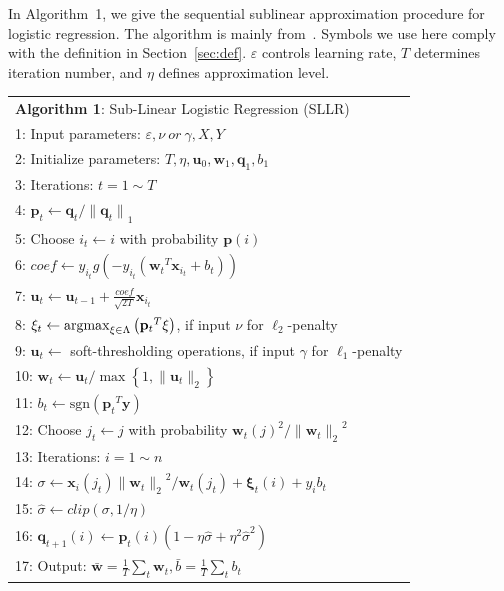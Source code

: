 \documentclass[10pt, conference, compsocconf]{IEEEtran}
\newcommand{\bw}{\mathbf{w}}
\newcommand{\bu}{\mathbf{u}}
\newcommand{\bp}{\mathbf{p}}
\newcommand{\bq}{\mathbf{q}}
\newcommand{\bxi}{\mathbf{\xi}}
\newcommand{\lc}{\left(}
\newcommand{\rc}{\right)}
\newcommand{\li}{\lc i\rc}
\newcommand{\lj}{\lc j\rc}
\newcommand{\tspace}{\hspace*{2em}}
\newcommand{\tspaces}{\hspace*{1.5em}}
\def\argmax{\mathop{\rm argmax}}
\def\sgn{\mathrm{sgn}}
\begin{document}
In Algorithm~1, we give the sequential sublinear approximation procedure for logistic regression. The algorithm is mainly from~\cite{peng2012sublinear}. Symbols we use here comply with the definition in Section~\ref{sec:def}. $\varepsilon$ controls learning rate, $T$ determines iteration number, and $\eta$ defines approximation level.
	\begin{table} [ht]
	\begin{tabular}{l}
	\hline\noalign{\smallskip}
	\textbf{Algorithm 1}: Sub-Linear Logistic Regression (SLLR) \\
	\noalign{\smallskip}
	\hline
	\noalign{\smallskip}
	1:	Input parameters: $\varepsilon, \nu~or~\gamma, X, Y$ \\
	2:	Initialize parameters: $T, \eta, {\mathbf{u}}_{0}, {\bw}_{1}, {\mathbf{\bq}}_{1}, {b}_{1}$\\
	3:	Iterations: $t=1 \sim T$ \\
	4:	\tspace ${\bp}_{t}\leftarrow{\bq}_{t}/{\|{\bq}_{t}\|}_{1}$ \\
	5:  \tspace Choose ${i}_{t}\leftarrow i$ with probability $\bp(i)$ \\
	6:	\tspace $coef\leftarrow{y}_{{i}_{t}}g\lc-{y}_{{i}_{t}}\lc {{\bw}_{t}}^{T}{\mathbf{x}}_{i_t}+{b}_{t} \rc\rc$ \\
	7:	\tspace ${\bu}_{t}\leftarrow {\bu}_{t-1}+\frac{coef}{\sqrt{2T}}{\mathbf{x}}_{{i}_{t}}$ \\
    8:  \tspace ${\bxi}_{t}\leftarrow \argmax_{\bxi\in \Lambda}\lc{{\bp}_{t}}^{T}\bxi\rc$, if input $\nu$ for $\ell_2$-penalty \\
    9:  \tspace $\bu_t\leftarrow$ soft-thresholding operations, if input $\gamma$ for $\ell_1$-penalty \\
	10:	\tspaces ${\bw}_{t}\leftarrow {\bu}_{t}/\max \left\{1,\|{\bu}_{t}\|_2 \right\}$ \\
    11: \tspaces ${b}_{t}\leftarrow \sgn\lc {{\bp}_{t}}^{T}\mathbf{y}\rc$ \\
	12:	\tspaces Choose ${j}_{t}\leftarrow j$ with probability ${{\bw}_{t}\lj}^{2}/{\|{\bw}_{t}\|_2}^{2} $ \\
	13:	\tspaces Iterations: $i=1 \sim n$ \\
	14:	\tspaces\tspace $\sigma \leftarrow \mathbf{x}_{i} \lc {j}_{t}\rc{\|{\bw}_{t}\|_2}^{2}/{\bw}_{t}\lc {j}_{t} \rc+{\bxi}_{t}\li+{y}_{i}{b}_{t}$ \\
	15:	\tspaces\tspace $\hat{\sigma} \leftarrow clip\lc \sigma,1/\eta \rc$ \\
	16:	\tspaces\tspace ${\bq}_{t+1}\li \leftarrow {\bp}_{t}\li\lc 1-\eta\hat{\sigma} + {\eta}^{2}{\hat{\sigma}}^{2} \rc$ \\
	17:	Output: $\bar{\bw}=\frac{1}{T}\sum_{t}{\bw}_{t},\bar{b}=\frac{1}{T}\sum_{t}{b}_{t}$ \\
	\hline
	\end{tabular} 	
	\label{alg:1}
	\end{table}
\end{document}
